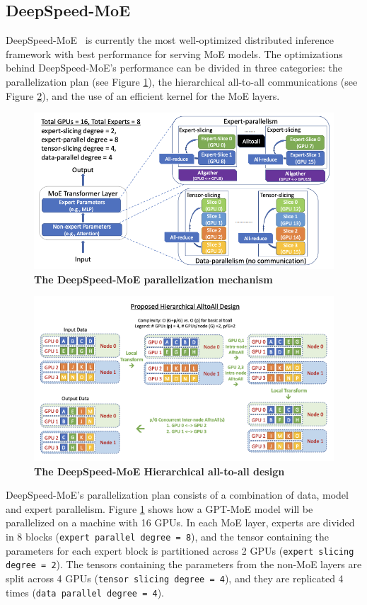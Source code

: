 \subsection{DeepSpeed-MoE}
DeepSpeed-MoE~\cite{deepspeed-moe} is currently the most well-optimized distributed inference framework with best performance for serving MoE models. The optimizations behind DeepSpeed-MoE's performance can be divided in three categories: the parallelization plan (see Figure \ref{fig:deepspeed-moe-parallelization}), the hierarchical all-to-all communications (see Figure \ref{fig:deepspeed-moe-a2a}), and the use of an efficient kernel for the MoE layers.
\begin{figure}[H]
    \centering
    \includegraphics[width=0.6\linewidth]{figures/deepspeed-moe-parallelization.png}
    \caption{\textbf{The DeepSpeed-MoE parallelization mechanism~\cite{deepspeed-moe}}}
    \label{fig:deepspeed-moe-parallelization}
\end{figure}
\begin{figure}[H]
    \centering
    \includegraphics[width=0.6\linewidth]{figures/deepspeed-moe-a2a.png}
    \caption{\textbf{The DeepSpeed-MoE Hierarchical all-to-all design~\cite{deepspeed-moe}}}
    \label{fig:deepspeed-moe-a2a}
\end{figure}
DeepSpeed-MoE's parallelization plan consists of a combination of data, model and expert parallelism. Figure \ref{fig:deepspeed-moe-parallelization} shows how a GPT-MoE model will be parallelized on a machine with 16 GPUs. In each MoE layer, experts are divided in 8 blocks (\texttt{expert parallel degree = 8}), and the tensor containing the parameters for each expert block is partitioned across 2 GPUs (\texttt{expert slicing degree = 2}). The tensors containing the parameters from the non-MoE layers are split across 4 GPUs (\texttt{tensor slicing degree = 4}), and they are replicated 4 times (\texttt{data parallel degree = 4}).

